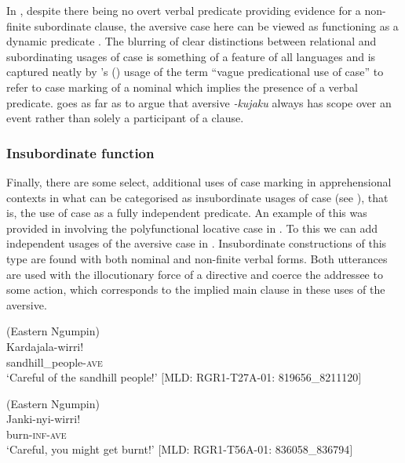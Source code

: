 \documentclass[output=paper,colorlinks,citecolor=brown]{langscibook}
\begin{document}
\noindent In , despite there being no overt verbal predicate providing evidence for a non-finite subordinate clause, the aversive case here can be viewed as functioning as a dynamic predicate \citep{laughren_expressing_2015}. The blurring of clear distinctions between relational and subordinating usages of case is something of a feature of all  languages and is captured neatly by \citeauthor{hale_essential_1982}'s (\citeyear[285]{hale_essential_1982}) usage of the term ``vague predicational use of case'' to refer to case marking of a nominal which implies the presence of a verbal predicate. \citet{laughren_expressing_2015} goes as far as to argue that aversive \textit{-kujaku} always has scope over an event rather than solely a participant of a clause.


\subsubsection{Insubordinate function}
\label{subsubsec:insubordinate}

Finally, there are some select, additional uses of case marking in apprehensional contexts in what can be categorised as insubordinate usages of case (see \cite{evans_insubordination_2007,evans_insubordination_2016}), that is, the use of case as a fully independent predicate. An example of this was provided in  involving the polyfunctional locative case in . To this we can add independent usages of the aversive case in . Insubordinate constructions of this type are found with both nominal  and non-finite verbal  forms. Both utterances are used with the illocutionary force of a directive and coerce the addressee to some action, which corresponds to the implied main clause in these uses of the aversive.

\ea 
\textnormal{ (Eastern Ngumpin)} \\
\gll Kardajala-wirri! \\
sandhill\_people-\textsc{ave} \\
\glt `Careful of the sandhill people!' $[$MLD: RGR1-T27A-01: 819656\_8211120$]$
\label{ex:bro28}
\z

\ea 
\textnormal{ (Eastern Ngumpin)} \\
\gll Janki-nyi-wirri! \\
burn-\textsc{inf-ave} \\
\glt `Careful, you might get burnt!' $[$MLD: RGR1-T56A-01: 836058\_836794$]$
\label{ex:bro29}
\z
\end{document}
